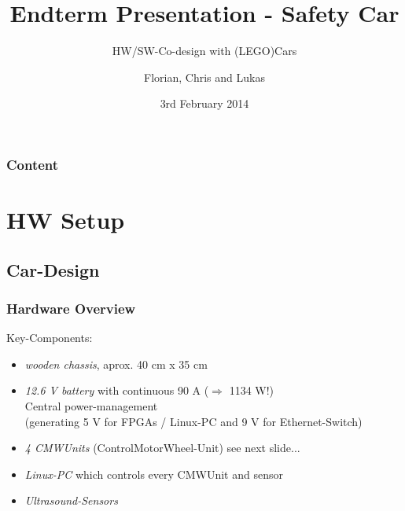 \documentclass{beamer}
\title{Endterm Presentation - Safety Car}
\subtitle{HW/SW-Co-design with (LEGO)Cars}
\author{Florian, Chris and Lukas}
\institute[TUM]{Technische Universität München}
\date{3rd February 2014}
\begin{document}
\begin{frame}
	\titlepage
\end{frame}

\begin{frame}
	\frametitle{Content}
	\tableofcontents
\end{frame}

\section{HW Setup}

\subsection{Car-Design}

\begin{frame}
	\frametitle{Hardware Overview}
	Key-Components:
	\begin{itemize}
		\item \textit{wooden chassis}, aprox. 40 cm x 35 cm
		
		\item \textit{12.6 V battery} with continuous 90 A ($\Rightarrow$ 1134 W!)\\
		Central power-management\\
		(generating 5 V for FPGAs / Linux-PC and 9 V for Ethernet-Switch)	
	
		\item \textit{4 CMWUnits} (ControlMotorWheel-Unit) see next slide...
		
		\item \textit{Linux-PC} which controls every CMWUnit and sensor
		
		\item \textit{Ultrasound-Sensors}
	\end{itemize}
\end{frame}
\end{document}

